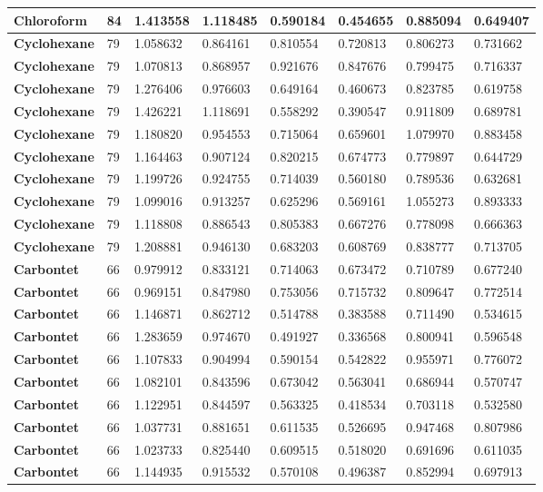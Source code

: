 \documentclass{amsart}
\begin{document}
\begin{center}
\begin{tabular}{|l|l|l|l|l|l|l|l|}
\textbf{Chloroform}& 84&1.413558&1.118485&0.590184&0.454655&0.885094&0.649407 \\ \hline 
\textbf{Cyclohexane}& 79&1.058632&0.864161&0.810554&0.720813&0.806273&0.731662 \\ \hline 
\textbf{Cyclohexane}& 79&1.070813&0.868957&0.921676&0.847676&0.799475&0.716337 \\ \hline 
\textbf{Cyclohexane}& 79&1.276406&0.976603&0.649164&0.460673&0.823785&0.619758 \\ \hline 
\textbf{Cyclohexane}& 79&1.426221&1.118691&0.558292&0.390547&0.911809&0.689781 \\ \hline 
\textbf{Cyclohexane}& 79&1.180820&0.954553&0.715064&0.659601&1.079970&0.883458 \\ \hline 
\textbf{Cyclohexane}& 79&1.164463&0.907124&0.820215&0.674773&0.779897&0.644729 \\ \hline 
\textbf{Cyclohexane}& 79&1.199726&0.924755&0.714039&0.560180&0.789536&0.632681 \\ \hline 
\textbf{Cyclohexane}& 79&1.099016&0.913257&0.625296&0.569161&1.055273&0.893333 \\ \hline 
\textbf{Cyclohexane}& 79&1.118808&0.886543&0.805383&0.667276&0.778098&0.666363 \\ \hline 
\textbf{Cyclohexane}& 79&1.208881&0.946130&0.683203&0.608769&0.838777&0.713705 \\ \hline 
\textbf{Carbontet}& 66&0.979912&0.833121&0.714063&0.673472&0.710789&0.677240 \\ \hline 
\textbf{Carbontet}& 66&0.969151&0.847980&0.753056&0.715732&0.809647&0.772514 \\ \hline 
\textbf{Carbontet}& 66&1.146871&0.862712&0.514788&0.383588&0.711490&0.534615 \\ \hline 
\textbf{Carbontet}& 66&1.283659&0.974670&0.491927&0.336568&0.800941&0.596548 \\ \hline 
\textbf{Carbontet}& 66&1.107833&0.904994&0.590154&0.542822&0.955971&0.776072 \\ \hline 
\textbf{Carbontet}& 66&1.082101&0.843596&0.673042&0.563041&0.686944&0.570747 \\ \hline 
\textbf{Carbontet}& 66&1.122951&0.844597&0.563325&0.418534&0.703118&0.532580 \\ \hline 
\textbf{Carbontet}& 66&1.037731&0.881651&0.611535&0.526695&0.947468&0.807986 \\ \hline 
\textbf{Carbontet}& 66&1.023733&0.825440&0.609515&0.518020&0.691696&0.611035 \\ \hline 
\textbf{Carbontet}& 66&1.144935&0.915532&0.570108&0.496387&0.852994&0.697913 \\ \hline 

\end{tabular}
\end{center}
\end{document}
